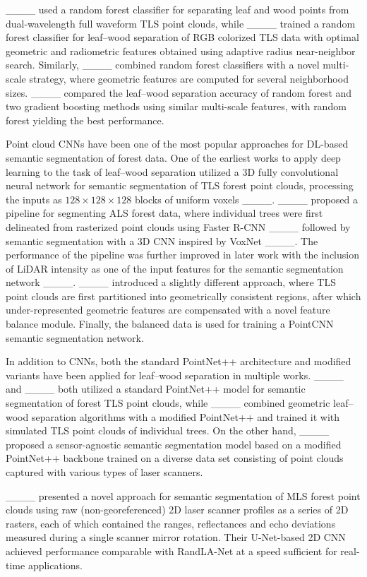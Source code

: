 ____ used a random forest classifier for separating leaf and wood points from dual-wavelength full waveform TLS point clouds, while ____ trained a random forest classifier for leaf--wood separation of RGB colorized TLS data with optimal geometric and radiometric features obtained using adaptive radius near-neighbor search. Similarly, ____ combined random forest classifiers with a novel multi-scale strategy, where geometric features are computed for several neighborhood sizes. ____ compared the leaf--wood separation accuracy of random forest and two gradient boosting methods using similar multi-scale features, with random forest yielding the best performance.

Point cloud CNNs have been one of the most popular approaches for DL-based semantic segmentation of forest data. One of the earliest works to apply deep learning to the task of leaf--wood separation utilized a 3D fully convolutional neural network for semantic segmentation of TLS forest point clouds, processing the inputs as $128\times128\times128$ blocks of uniform voxels ____. ____ proposed a pipeline for segmenting ALS forest data, where individual trees were first delineated from rasterized point clouds using Faster R-CNN ____ followed by semantic segmentation with a 3D CNN inspired by VoxNet ____. The performance of the pipeline was further improved in later work with the inclusion of LiDAR intensity as one of the input features for the semantic segmentation network ____. ____ introduced a slightly different approach, where TLS point clouds are first partitioned into geometrically consistent regions, after which under-represented geometric features are compensated with a novel feature balance module. Finally, the balanced data is used for training a PointCNN semantic segmentation network.

In addition to CNNs, both the standard PointNet++ architecture and modified variants have been applied for leaf--wood separation in multiple works. ____ and ____ both utilized a standard PointNet++ model for semantic segmentation of forest TLS point clouds, while ____ combined geometric leaf--wood separation algorithms with a modified PointNet++ and trained it with simulated TLS point clouds of individual trees. On the other hand, ____ proposed a sensor-agnostic semantic segmentation model based on a modified PointNet++ backbone trained on a diverse data set consisting of point clouds captured with various types of laser scanners.

____ presented a novel approach for semantic segmentation of MLS forest point clouds using raw (non-georeferenced) 2D laser scanner profiles as a series of 2D rasters, each of which contained the ranges, reflectances and echo deviations measured during a single scanner mirror rotation. Their U-Net-based 2D CNN achieved performance comparable with RandLA-Net at a speed sufficient for real-time applications.

